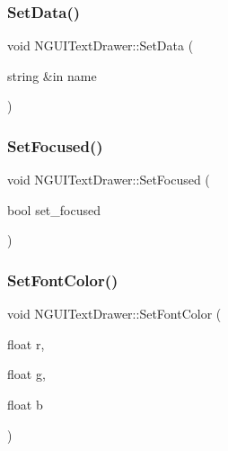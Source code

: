 \subsubsection{\texorpdfstring{Set\+Data()}{SetData()}}
{\footnotesize\ttfamily void N\+G\+U\+I\+Text\+Drawer\+::\+Set\+Data (\begin{DoxyParamCaption}\item[{string \&in}]{name }\end{DoxyParamCaption})}

\hypertarget{class_n_g_u_i_text_drawer_a91625eb9d53647c8c33ca1f5bae90436}{}\label{class_n_g_u_i_text_drawer_a91625eb9d53647c8c33ca1f5bae90436} 
\subsubsection{\texorpdfstring{Set\+Focused()}{SetFocused()}}
{\footnotesize\ttfamily void N\+G\+U\+I\+Text\+Drawer\+::\+Set\+Focused (\begin{DoxyParamCaption}\item[{bool}]{set\+\_\+focused }\end{DoxyParamCaption})}

\hypertarget{class_n_g_u_i_text_drawer_ac824ed4f17b947d293804b963e86fff8}{}\label{class_n_g_u_i_text_drawer_ac824ed4f17b947d293804b963e86fff8} 
\subsubsection{\texorpdfstring{Set\+Font\+Color()}{SetFontColor()}}
{\footnotesize\ttfamily void N\+G\+U\+I\+Text\+Drawer\+::\+Set\+Font\+Color (\begin{DoxyParamCaption}\item[{float}]{r,  }\item[{float}]{g,  }\item[{float}]{b }\end{DoxyParamCaption})}

\hypertarget{class_n_g_u_i_text_drawer_acfa4743716488dba8a560c569a360fc9}{}\label{class_n_g_u_i_text_drawer_acfa4743716488dba8a560c569a360fc9} 
